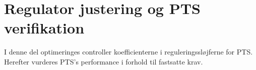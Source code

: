 \part{Regulator justering og PTS verifikation}
I denne del optimeringes controller koefficienterne i reguleringssløjferne for PTS. Herefter vurderes PTS's performance i forhold til fastsatte krav.

%
